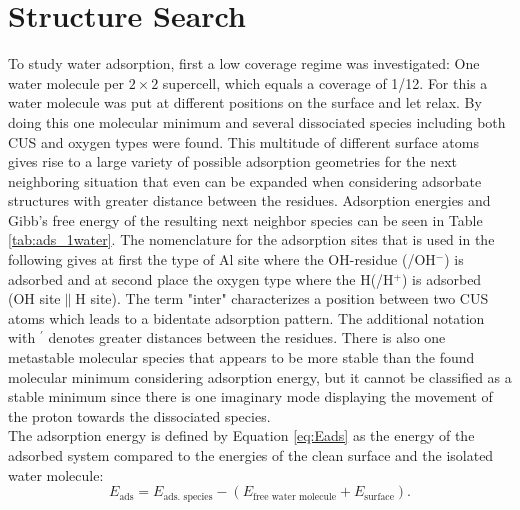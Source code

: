 \documentclass[11pt,DIV=13,BCOR=5mm,a4paper,headinclude]{scrbook}
\begin{document}
\section{Structure Search}\label{structure_search11-20}
To study water adsorption, first a low coverage regime was investigated: One water molecule per $2\times 2$ supercell, which equals a coverage of 1/12.
For this a water molecule was put at different positions on the surface and let relax.
By doing this one molecular minimum and several dissociated species including both CUS and oxygen types were found.
This multitude of different surface atoms gives rise to a large variety of possible adsorption geometries for the next neighboring situation that even can be expanded when considering adsorbate structures with greater distance between the residues.
Adsorption energies and Gibb's free energy of the resulting next neighbor species can be seen in Table \ref{tab:ads_1water}.
The nomenclature for the adsorption sites that is used in the following gives at first the type of Al site where the OH-residue (/OH$^-$) is adsorbed and at second place the oxygen type where the H(/H$^+$) is adsorbed (OH site$\parallel$H site).
The term "inter" characterizes a position between two CUS atoms which leads to a bidentate adsorption pattern.
The additional notation with $^\prime$ denotes greater distances between the residues.
There is also one metastable molecular species that appears to be more stable than the found molecular minimum considering adsorption energy, but it cannot be classified as a stable minimum since there is one imaginary mode displaying the movement of the proton towards the dissociated species.
\\
The adsorption energy is defined by Equation \ref{eq:Eads} as the energy of the adsorbed system compared to the energies of the clean surface and the isolated water molecule:
\begin{equation}\label{eq:Eads}
 E_\textrm{ads}=E_\text{ads.
species}-(E_\text{free water molecule}+E_\text{surface}).
\end{equation}
\end{document}
